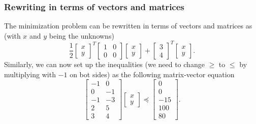 \documentclass{beamer}
\begin{document}
\begin{frame}
\frametitle{Rewriting in terms of vectors and matrices}

The minimization problem can be rewritten in terms of vectors and matrices as (with $x$ and $y$ being the unknowns)
\[
\frac{1}{2}\begin{bmatrix} x\\ y \end{bmatrix}^T   \begin{bmatrix} 1 & 0\\ 0 & 0  \end{bmatrix}  \begin{bmatrix} x \\ y \end{bmatrix}  + \begin{bmatrix}3\\ 4  \end{bmatrix}^T \begin{bmatrix}x \\ y  \end{bmatrix}.  
\]
Similarly, we can now set up the inequalities (we need to change $\geq$ to $\leq$ by multiplying with $-1$ on bot sides) as the following matrix-vector equation
\[
\begin{bmatrix} -1 & 0 \\ 0 & -1 \\ -1 & -3 \\ 2 & 5 \\ 3 & 4\end{bmatrix}\begin{bmatrix} x \\ y\end{bmatrix} \preceq \begin{bmatrix}0 \\ 0\\ -15 \\ 100 \\ 80\end{bmatrix}.
\]
\end{frame}
\end{document}
